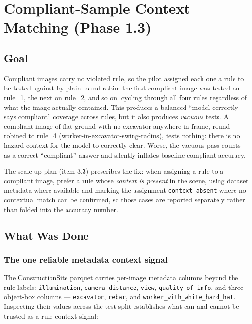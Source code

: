 \chapter{Compliant-Sample Context Matching (Phase 1.3)}
\label{chap:p1-3}

\section{Goal}

Compliant images carry no violated rule, so the pilot assigned each one a rule to be tested against by
plain round-robin: the first compliant image was tested on rule\_1, the next on rule\_2, and so on,
cycling through all four rules regardless of what the image actually contained. This produces a
balanced ``model correctly says compliant'' coverage across rules, but it also produces \emph{vacuous}
tests. A compliant image of flat ground with no excavator anywhere in frame, round-robined to rule\_4
(worker-in-excavator-swing-radius), tests nothing: there is no hazard context for the model to
correctly clear. Worse, the vacuous pass counts as a correct ``compliant'' answer and silently
inflates baseline compliant accuracy.

The scale-up plan (item 3.3) prescribes the fix: when assigning a rule to a compliant image, prefer a
rule whose \emph{context is present} in the scene, using dataset metadata where available and marking
the assignment \texttt{context\_absent} where no contextual match can be confirmed, so those cases are
reported separately rather than folded into the accuracy number.

\section{What Was Done}

\subsection{The one reliable metadata context signal}

The ConstructionSite parquet carries per-image metadata columns beyond the rule labels:
\texttt{illumination}, \texttt{camera\_distance}, \texttt{view}, \texttt{quality\_of\_info}, and three
object-box columns --- \texttt{excavator}, \texttt{rebar}, and \texttt{worker\_with\_white\_hard\_hat}.
Inspecting their values across the test split establishes what can and cannot be trusted as a rule
context signal:

